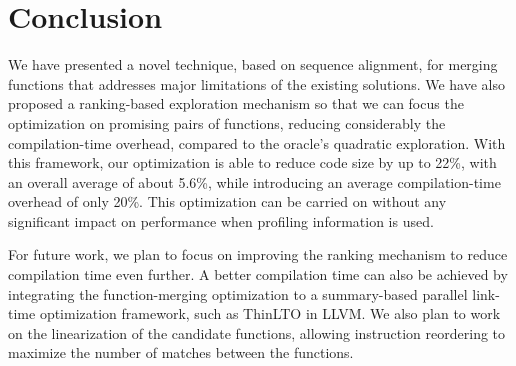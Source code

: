 
\section{Conclusion}

We have presented a novel technique, based on sequence alignment, for merging
functions that addresses major limitations of the existing solutions.
We have also proposed a ranking-based exploration mechanism so that we can focus
the optimization on promising pairs of functions, reducing considerably the
compilation-time overhead, compared to the oracle's quadratic exploration.
With this framework, our
optimization is able to reduce code size by up to 22\%, with an overall average
of about 5.6\%, while introducing an average compilation-time overhead of only 20\%.
This optimization can be carried on without any significant impact on
performance when profiling information is used.

For future work, we plan to focus on improving the ranking mechanism to reduce
compilation time even further.
A better compilation time can also be achieved by integrating the
function-merging optimization to a summary-based parallel link-time optimization
framework, such as ThinLTO in LLVM.
We also plan to work on the linearization of the candidate functions, allowing
instruction reordering to maximize the number of matches between the functions.
